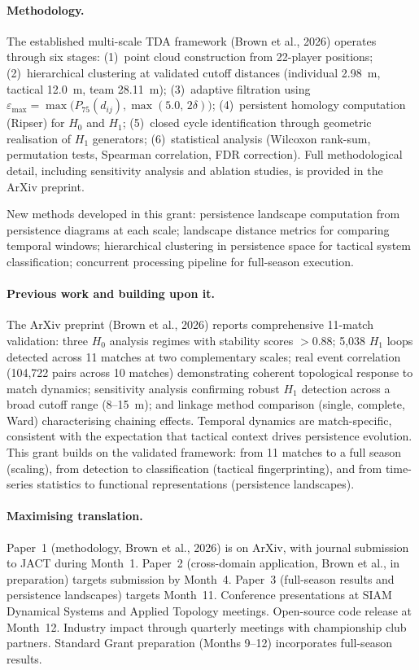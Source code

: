 \paragraph{Methodology.}
The established multi-scale TDA framework (Brown et al., 2026) operates through six stages: (1)~point cloud construction from 22-player positions; (2)~hierarchical clustering at validated cutoff distances (individual 2.98~m, tactical 12.0~m, team 28.11~m); (3)~adaptive filtration using $\varepsilon_{\max} = \max\bigl(P_{75}(d_{ij}), \max(5.0,\, 2\delta)\bigr)$; (4)~persistent homology computation (Ripser) for $H_0$ and $H_1$; (5)~closed cycle identification through geometric realisation of $H_1$ generators; (6)~statistical analysis (Wilcoxon rank-sum, permutation tests, Spearman correlation, FDR correction). Full methodological detail, including sensitivity analysis and ablation studies, is provided in the ArXiv preprint.

New methods developed in this grant: persistence landscape computation from persistence diagrams at each scale; landscape distance metrics for comparing temporal windows; hierarchical clustering in persistence space for tactical system classification; concurrent processing pipeline for full-season execution.

\paragraph{Previous work and building upon it.}
The ArXiv preprint (Brown et al., 2026) reports comprehensive 11-match validation: three $H_0$ analysis regimes with stability scores ${>}0.88$; 5{,}038 $H_1$ loops detected across 11 matches at two complementary scales; real event correlation (104{,}722 pairs across 10 matches) demonstrating coherent topological response to match dynamics; sensitivity analysis confirming robust $H_1$ detection across a broad cutoff range (8--15~m); and linkage method comparison (single, complete, Ward) characterising chaining effects. Temporal dynamics are match-specific, consistent with the expectation that tactical context drives persistence evolution. This grant builds on the validated framework: from 11 matches to a full season (scaling), from detection to classification (tactical fingerprinting), and from time-series statistics to functional representations (persistence landscapes).

\paragraph{Maximising translation.}
Paper~1 (methodology, Brown et al., 2026) is on ArXiv, with journal submission to JACT during Month~1. Paper~2 (cross-domain application, Brown et al., in preparation) targets submission by Month~4. Paper~3 (full-season results and persistence landscapes) targets Month~11. Conference presentations at SIAM Dynamical Systems and Applied Topology meetings. Open-source code release at Month~12. Industry impact through quarterly meetings with championship club partners. Standard Grant preparation (Months 9--12) incorporates full-season results.

